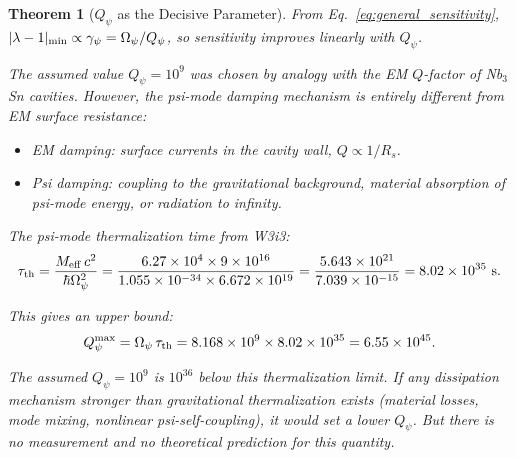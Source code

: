 \documentclass[11pt,twocolumn]{article}
\newcommand{\lam}{\lambda}
\newcommand{\Opsi}{\Omega_\psi}
\newcommand{\gpsi}{\gamma_\psi}
\newcommand{\Meff}{M_{\rm eff}}
\newcommand{\ee}[1]{\times 10^{#1}}
\newcommand{\Qpsi}{Q_\psi}
\newtheorem{theorem}{Theorem}[section]
\theoremstyle{definition}
\theoremstyle{remark}
\begin{document}
\begin{theorem}[$\Qpsi$ as the Decisive Parameter]
\label{thm:Qpsi}
From Eq.~\eqref{eq:general_sensitivity}, $|\lam-1|_{\rm min} \propto
\gpsi = \Opsi/\Qpsi$, so sensitivity improves linearly with $\Qpsi$.

The assumed value $\Qpsi = 10^9$ was chosen by analogy with the EM
$Q$-factor of Nb$_3$Sn cavities. However, the psi-mode damping mechanism
is entirely different from EM surface resistance:
\begin{itemize}[nosep]
\item EM damping: surface currents in the cavity wall, $Q \propto 1/R_s$.
\item Psi damping: coupling to the gravitational background, material
  absorption of psi-mode energy, or radiation to infinity.
\end{itemize}

The psi-mode thermalization time from W3i3:
\begin{equation}
\tau_{\rm th} = \frac{\Meff\,c^2}{\hbar\Opsi^2}
= \frac{6.27\ee{4}\times 9\ee{16}}{1.055\ee{-34}\times 6.672\ee{19}}
= \frac{5.643\ee{21}}{7.039\ee{-15}}
= 8.02\ee{35}~\text{s}.
\label{eq:tau_th}
\end{equation}

This gives an upper bound:
\begin{equation}
\Qpsi^{\rm max} = \Opsi\,\tau_{\rm th}
= 8.168\ee{9}\times 8.02\ee{35} = 6.55\ee{45}.
\label{eq:Qpsi_max}
\end{equation}

The assumed $\Qpsi = 10^9$ is $10^{36}$ below this thermalization limit.
If any dissipation mechanism stronger than gravitational thermalization
exists (material losses, mode mixing, nonlinear psi-self-coupling), it
would set a lower $\Qpsi$. But there is no measurement and no theoretical
prediction for this quantity.
\end{theorem}
\end{document}
